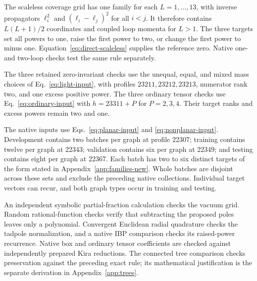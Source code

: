 The scaleless coverage grid has one family for each $L=1,\ldots,13$, with inverse propagators $\ell_i^2$ and $(\ell_i-\ell_j)^2$ for all $i<j$. It therefore contains $L(L+1)/2$ coordinates and coupled loop momenta for $L>1$. The three targets set all powers to one, raise the first power to two, or change the first power to minus one. Equation~\eqref{eq:direct-scaleless} supplies the reference zero. Native one- and two-loop checks test the same rule separately.

The three retained zero-invariant checks use the unequal, equal, and mixed mass choices of Eq.~\eqref{eq:light-input}, with profiles $23211,23212,23213$, numerator rank two, and one excess positive power. The three ordinary tensor checks use Eq.~\eqref{eq:ordinary-input} with $h=23311+P$ for $P=2,3,4$. Their target ranks and excess powers remain two and one.

The native inputs use Eqs.~\eqref{eq:planar-input} and \eqref{eq:nonplanar-input}. Development contains two batches per graph at profile 22307; training contains twelve per graph at 22343; validation contains six per graph at 22349; and testing contains eight per graph at 22367. Each batch has two to six distinct targets of the form stated in Appendix~\ref{app:families-new}. Whole batches are disjoint across these sets and exclude the preceding native collections. Individual target vectors can recur, and both graph types occur in training and testing.

An independent symbolic partial-fraction calculation checks the vacuum grid. Random rational-function checks verify that subtracting the proposed poles leaves only a polynomial. Convergent Euclidean radial quadrature checks the tadpole normalization, and a native IBP comparison checks its raised-power recurrence. Native box and ordinary tensor coefficients are checked against independently prepared Kira reductions. The connected tree comparison checks preservation against the preceding exact rule; its mathematical justification is the separate derivation in Appendix~\ref{app:trees}.

